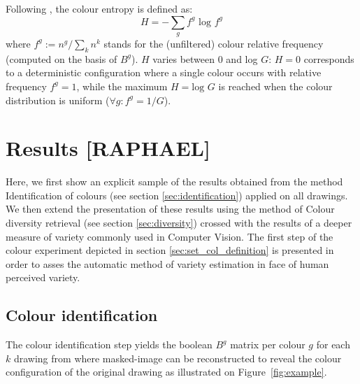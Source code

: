 \documentclass[11pt,a4paper]{article}
\begin{document}
Following \citet{Shannon1948}, the colour entropy is defined as:
\begin{equation}
	H = -\sum_{g} f^{g}\mbox{ log }f^{g}
\end{equation}
where $f^{g}:= n^{g}/\sum_{k}n^{k}$ stands for the (unfiltered) colour relative frequency (computed on the basis of $B^{g}$). $H$ varies between 0 and log $G$: $H=0$ corresponds to a deterministic configuration where a single colour occurs with relative frequency $f^{g} = 1$, while the maximum $H=\mbox{log }G$ is reached when the colour distribution is uniform ($\forall g: f^{g} = 1/G$).

\section{Results [RAPHAEL]}
\label{sec:results}
Here, we first show an explicit sample of the results obtained from the method Identification of colours (see section \ref{sec:identification}) applied on all drawings. 
We then extend the presentation of these results using the method of Colour diversity retrieval (see section \ref{sec:diversity}) crossed with the results of a deeper measure of variety commonly used in Computer Vision. 
The first step of the colour experiment depicted in section \ref{sec:set_col_definition} is presented in order to asses the automatic method of variety estimation in face of human perceived variety.

\subsection{Colour identification}
\label{sec:results_identification}
The colour identification step yields the boolean $B^g$ matrix per colour $g$ for each $k$ drawing from where masked-image can be reconstructed to reveal the colour configuration of the original drawing as illustrated on Figure~\ref{fig:example}.
\end{document}
